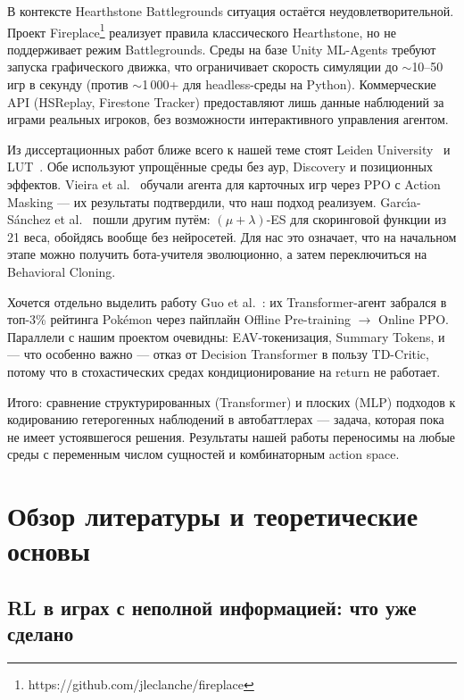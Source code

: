 \documentclass[a4paper,12pt]{extarticle}
\begin{document}
В контексте Hearthstone Battlegrounds ситуация остаётся неудовлетворительной. Проект Fireplace\footnote{https://github.com/jleclanche/fireplace} реализует правила классического Hearthstone, но не поддерживает режим Battlegrounds. Среды на базе Unity ML-Agents требуют запуска графического движка, что ограничивает скорость симуляции до $\sim$10--50 игр в секунду (против $\sim$1\,000+ для headless-среды на Python). Коммерческие API (HSReplay, Firestone Tracker) предоставляют лишь данные наблюдений за играми реальных игроков, без возможности интерактивного управления агентом.

Из диссертационных работ ближе всего к нашей теме стоят Leiden University~\cite{hs_leiden} и LUT~\cite{hs_lut}. Обе используют упрощённые среды без аур, Discovery и позиционных эффектов. Vieira et al.~\cite{vieira2022} обучали агента для карточных игр через PPO с Action Masking --- их результаты подтвердили, что наш подход реализуем. Garc\'{\i}a-S\'{a}nchez et al.~\cite{coevolution} пошли другим путём: $(\mu+\lambda)$-ES для скоринговой функции из 21 веса, обойдясь вообще без нейросетей. Для нас это означает, что на начальном этапе можно получить бота-учителя эволюционно, а затем переключиться на Behavioral Cloning.

Хочется отдельно выделить работу Guo et al.~\cite{pokemon}: их Transformer-агент забрался в топ-3\% рейтинга Pok\'{e}mon через пайплайн Offline Pre-training $\to$ Online PPO. Параллели с нашим проектом очевидны: EAV-токенизация, Summary Tokens, и --- что особенно важно --- отказ от Decision Transformer в пользу TD-Critic, потому что в стохастических средах кондиционирование на return не работает.

Итого: сравнение структурированных (Transformer) и плоских (MLP) подходов к кодированию гетерогенных наблюдений в автобаттлерах --- задача, которая пока не имеет устоявшегося решения. Результаты нашей работы переносимы на любые среды с переменным числом сущностей и комбинаторным action space.

\newpage

\section{Обзор литературы и теоретические основы}

\subsection{RL в играх с неполной информацией: что уже сделано}
\end{document}
